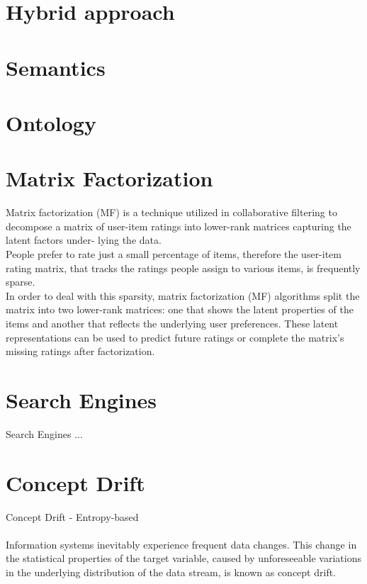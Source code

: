 \documentclass[10pt,oneside,english,a4paper]{article}
\begin{document}
\section{Hybrid approach}

\clearpage
\section{Semantics}

\section{Ontology}

\section{Matrix Factorization}
Matrix factorization (MF) is a technique utilized in collaborative filtering to decompose
a matrix of user-item ratings into lower-rank matrices capturing the latent factors under-
lying the data\cite{Tokala2023}.\\
People prefer to rate just a small percentage of items, therefore the user-item rating matrix, that tracks the ratings people assign to various items, is frequently sparse.\\
In order to deal with this sparsity, matrix factorization (MF) algorithms split the matrix into two lower-rank matrices: one that shows the latent properties of the items and another that reflects the underlying user preferences. These latent representations can be used to predict future ratings or complete the matrix's missing ratings after factorization.

\section{Search Engines}
Search Engines ... \cite{pub.1171882357}

\clearpage
\section{Concept Drift}
Concept Drift - Entropy-based\\\\
Information systems inevitably experience frequent data changes. 
This change in the statistical properties of the target variable, caused by
unforeseeable variations in the underlying distribution of the data
stream, is known as concept drift.\cite{Sun2024}


\clearpage
\thispagestyle{empty}
\mbox{}
\clearpage








\clearpage 
\normalsize 
 
 
\nocite{*}
\end{document}
